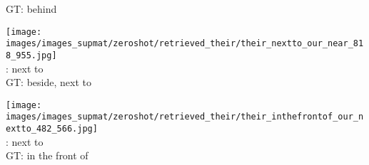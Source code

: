 \documentclass[10pt,twocolumn,letterpaper]{article}
\begin{document}
\begin{figure*}[t]
\begin{minipage}[t]{0.185\textwidth}
       GT: behind
       \vspace{0.2ex}
    \end{minipage}
    \hspace{0.005\textwidth}
    \begin{minipage}[t]{0.185\textwidth}
    	\centering
       	\texttt{[image: images/images\_supmat/zeroshot/retrieved\_their/their\_nextto\_our\_near\_818\_955.jpg]}\\
       	\vspace{0.3ex}
       	\cite{Lu16}: next to \\
       	GT: beside, next to
       	\vspace{0.2ex}
    \end{minipage}
    \hspace{0.005\textwidth}  
    \begin{minipage}[t]{0.185\textwidth}
    	\centering
       	\texttt{[image: images/images\_supmat/zeroshot/retrieved\_their/their\_inthefrontof\_our\_nextto\_482\_566.jpg]}\\
		\vspace{0.3ex}       	
       	\cite{Lu16}: next to \\
       	GT: in the front of
      	\vspace{0.2ex}
    \end{minipage} 


\end{figure*}
\end{document}

